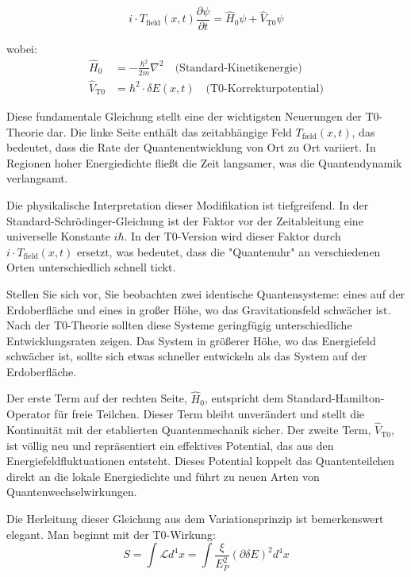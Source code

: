 \documentclass[12pt,a4paper]{article}
\newcommand{\deltaE}{\delta E}
\newcommand{\xipar}{\xi}
\newcommand{\EPlanck}{E_P}
\theoremstyle{definition}
\theoremstyle{remark}
\begin{document}
\begin{equation}
	\boxed{i \cdot T_{\text{field}}(x,t) \frac{\partial\psi}{\partial t} = \hat{H}_0 \psi + \hat{V}_{\text{T0}} \psi}
	\label{eq:t0_schrodinger_general}
\end{equation}

wobei:
\begin{align}
	\hat{H}_0 &= -\frac{\hbar^2}{2m} \nabla^2 \quad \text{(Standard-Kinetikenergie)} \\
	\hat{V}_{\text{T0}} &= \hbar^2 \cdot \deltaE(x,t) \quad \text{(T0-Korrekturpotential)}
\end{align}

Diese fundamentale Gleichung stellt eine der wichtigsten Neuerungen der T0-Theorie dar. Die linke Seite enthält das zeitabhängige Feld $T_{\text{field}}(x,t)$, das bedeutet, dass die Rate der Quantenentwicklung von Ort zu Ort variiert. In Regionen hoher Energiedichte fließt die Zeit langsamer, was die Quantendynamik verlangsamt.

Die physikalische Interpretation dieser Modifikation ist tiefgreifend. In der Standard-Schrödinger-Gleichung ist der Faktor vor der Zeitableitung eine universelle Konstante $i\hbar$. In der T0-Version wird dieser Faktor durch $i \cdot T_{\text{field}}(x,t)$ ersetzt, was bedeutet, dass die "Quantenuhr" an verschiedenen Orten unterschiedlich schnell tickt.

Stellen Sie sich vor, Sie beobachten zwei identische Quantensysteme: eines auf der Erdoberfläche und eines in großer Höhe, wo das Gravitationsfeld schwächer ist. Nach der T0-Theorie sollten diese Systeme geringfügig unterschiedliche Entwicklungsraten zeigen. Das System in größerer Höhe, wo das Energiefeld schwächer ist, sollte sich etwas schneller entwickeln als das System auf der Erdoberfläche.

Der erste Term auf der rechten Seite, $\hat{H}_0$, entspricht dem Standard-Hamilton-Operator für freie Teilchen. Dieser Term bleibt unverändert und stellt die Kontinuität mit der etablierten Quantenmechanik sicher. Der zweite Term, $\hat{V}_{\text{T0}}$, ist völlig neu und repräsentiert ein effektives Potential, das aus den Energiefeldfluktuationen entsteht. Dieses Potential koppelt das Quantenteilchen direkt an die lokale Energiedichte und führt zu neuen Arten von Quantenwechselwirkungen.

Die Herleitung dieser Gleichung aus dem Variationsprinzip ist bemerkenswert elegant. Man beginnt mit der T0-Wirkung:
$$S = \int \mathcal{L} d^4x = \int \frac{\xipar}{\EPlanck^2} (\partial \deltaE)^2 d^4x$$
\end{document}
